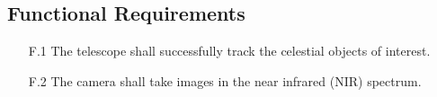 \subsection{Functional Requirements}

\begin{enumerate}
    \item[F.1] The telescope shall successfully track the celestial objects of interest.
    \item[F.2] The camera shall take images in the near infrared (NIR) spectrum.
\end{enumerate}
